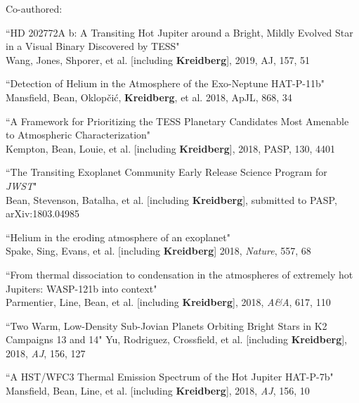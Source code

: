 \documentclass[12pt,letterpaper]{article}
\begin{document}
\vspace{3mm}
\hspace*{5mm}Co-authored:
\begin{compactenum}
\setcounter{enumi}{12}
\item ``HD 202772A b: A Transiting Hot Jupiter around a Bright, Mildly Evolved Star in a Visual Binary Discovered by TESS"\\
    Wang, Jones, Shporer, et al. [including \textbf{Kreidberg}], 2019, AJ, 157, 51

\item ``Detection of Helium in the Atmosphere of the Exo-Neptune HAT-P-11b"\\
Mansfield, Bean, Oklop\v{c}i\'{c}, \textbf{Kreidberg}, et al. 2018, ApJL, 868, 34

\item ``A Framework for Prioritizing the TESS Planetary Candidates Most Amenable to Atmospheric Characterization"\\
   Kempton, Bean, Louie, et al. [including \textbf{Kreidberg}], 2018, PASP, 130, 4401 

\item  ``The Transiting Exoplanet Community Early Release Science Program for \textit{JWST}"\\
    Bean, Stevenson, Batalha, et al. [including \textbf{Kreidberg}], submitted to PASP, arXiv:1803.04985

\item ``Helium in the eroding atmosphere of an exoplanet"\\
    Spake, Sing, Evans, et al. [including \textbf{Kreidberg}] 2018, \textit{Nature}, 557, 68

\item ``From thermal dissociation to condensation in the atmospheres of extremely hot Jupiters: WASP-121b into context"\\
	Parmentier, Line, Bean, et al. [including \textbf{Kreidberg}], 2018, \textit{A\&A}, 617, 110

\item ``Two Warm, Low-Density Sub-Jovian Planets Orbiting Bright Stars in K2 Campaigns 13 and 14"
	Yu, Rodriguez, Crossfield, et al. [including \textbf{Kreidberg}], 2018, \textit{AJ}, 156, 127 

\item ``A HST/WFC3 Thermal Emission Spectrum of the Hot Jupiter HAT-P-7b"\\
Mansfield, Bean, Line, et al. [including \textbf{Kreidberg}], 2018, \textit{AJ}, 156, 10


\end{compactenum}
\end{document}
